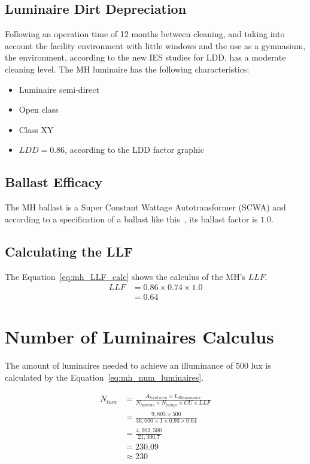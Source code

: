 \subsection{Luminaire Dirt Depreciation}
Following an operation time of 12 months between cleaning, and taking into account the facility environment with little windows and the use as a gymnasium, the environment, according to the new IES studies for LDD, has a moderate cleaning level. The MH luminaire has the following characteristics:
\begin{itemize}
\item Luminaire semi-direct
\item Open class
\item Class XY
\item $LDD = 0.86$, according to the LDD factor graphic
\end{itemize}

\subsection{Ballast Efficacy}
The MH ballast is a Super Constant Wattage Autotransformer (SCWA) and according to a specification of a ballast like this~\cite{www:mh_hps_ballast}, its ballast factor is $1.0$.

\subsection{Calculating the LLF}
The Equation~\ref{eq:mh_LLF_calc} shows the calculus of the MH's  $LLF$.
\begin{equation}
\begin{split}
LLF &= 0.86 \times 0.74 \times 1.0 \\
    &= 0.64
\end{split}
\label{eq:mh_LLF_calc}
\end{equation}

\section{Number of Luminaires Calculus}
The amount of luminaires needed to achieve an illuminance of $500$ lux is calculated by the Equation~\ref{eq:mh_num_luminaires}.

\begin{equation}
\begin{split}
N_{lum} & = \frac{A_{total\,area} \times L_{Illuminance}}
                {N_{lumens} \times N_{lamps} \times CU \times LLF} \\
 & = \frac{9,805 \times 500}
          {36,000 \times 1 \times 0.93 \times 0.64} \\
 & = \frac{4,902,500}
          {21,306.7} \\
 & = 230.09 \\
 & \approx 230
\end{split}
\label{eq:mh_num_luminaires}
\end{equation}

